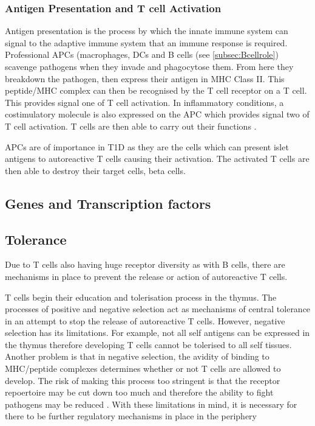 \subsubsection{Antigen Presentation and T cell Activation}

Antigen presentation is the process by which the innate immune system can signal to the adaptive immune system that an immune response is required.
Professional APCs (macrophages, DCs and B cells (see \cref{subsec:Bcellrole}) scavenge pathogens when they invade and phagocytose them.
From here they breakdown the pathogen, then express their antigen in MHC Class II.
This peptide/MHC complex can then be recognised by the T cell receptor on a T cell.
This provides signal one of T cell activation.
In inflammatory conditions, a costimulatory molecule is also expressed on the APC which provides signal two of T cell activation.
T cells are then able to carry out their functions .

APCs are of importance in T1D as they are the cells which can present islet antigens to autoreactive T cells causing their activation.
The activated T cells are then able to destroy their target cells, beta cells.

\subsection{Genes and Transcription factors}

\subsection{Tolerance}

Due to T cells also having huge receptor diversity as with B cells, there are mechanisms in place to prevent the release or action of autoreactive T cells.

T cells begin their education and tolerisation process in the thymus.
The processes of positive and negative selection act as mechanisms of central tolerance in an attempt to stop the release of autoreactive T cells\citep{Walker2002}.
However, negative selection has its limitations.
For example, not all self antigens can be expressed in the thymus therefore developing T cells cannot be tolerised to all self tissues.
Another problem is that in negative selection, the avidity of binding to MHC/peptide complexes determines whether or not T cells are allowed to develop.
The risk of making this process too stringent is that the receptor repoertoire may be cut down too much and therefore the ability to fight pathogens may be reduced \citep{Walker2002}.
With these limitations in mind, it is necessary for there to be further regulatory mechanisms in place in the periphery

